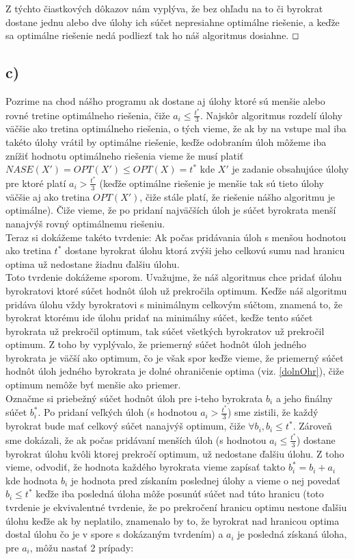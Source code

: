 \documentclass[a4paper]{article}
\begin{document}
Z týchto čiastkových dôkazov nám vyplýva, že bez ohľadu na to či byrokrat dostane jednu alebo dve úlohy ich súčet nepresiahne optimálne riešenie, a keďže sa optimálne riešenie nedá podliezť tak ho náš algoritmus dosiahne. $\oblong$

\subsection*{c)}

Pozrime na chod nášho programu ak dostane aj úlohy ktoré sú menšie alebo rovné tretine optimálneho riešenia, čiže $a_i \leq \frac{t^*}{3}$. Najskôr algoritmus rozdelí úlohy väčšie ako tretina optimálneho riešenia, o tých vieme, že ak by na vstupe mal iba takéto úlohy vrátil by optimálne riešenie, keďže odobraním úloh môžeme iba znížiť hodnotu optimálneho riešenia vieme že musí platiť $NASE(X') = OPT(X') \leq OPT(X) = t^*$ kde $X'$ je zadanie obsahujúce úlohy pre ktoré platí $a_i > \frac{t^*}{3}$ (keďže optimálne riešenie je menšie tak sú tieto úlohy väčšie aj ako tretina $OPT(X')$, čiže stále platí, že riešenie nášho algoritmu je optimálne). Čiže vieme, že po pridaní najväčších úloh je súčet byrokrata menší nanajvýš rovný optimálnemu riešeniu.
\\

Teraz si dokážeme takéto tvrdenie: Ak počas pridávania úloh s menšou hodnotou ako tretina $t^*$ dostane byrokrat úlohu ktorá zvýši jeho celkovú sumu nad hranicu optima už nedostane žiadnu ďalšiu úlohu.
\\

Toto tvrdenie dokážeme sporom. Uvažujme, že náš algoritmus chce pridať úlohu byrokratovi ktoré súčet hodnôt úloh už prekročila optimum. Keďže náš algoritmu pridáva úlohu vždy byrokratovi s minimálnym celkovým súčtom, znamená to, že byrokrat ktorému ide úlohu pridať na minimálny súčet, keďže tento súčet byrokrata už prekročil optimum, tak súčet všetkých byrokratov už prekročil optimum. Z toho by vyplývalo, že priemerný súčet hodnôt úloh jedného byrokrata je väčší ako optimum, čo je však spor keďže vieme, že priemerný súčet hodnôt úloh jedného byrokrata je dolné ohraničenie optima (viz. \ref{dolnOhr}), čiže optimum nemôže byť menšie ako priemer.
\\

Označme si priebežný súčet hodnôt úloh pre i-teho byrokrata $b_i$ a jeho finálny súčet $b^*_i$. Po pridaní veľkých úloh (s hodnotou $a_i > \frac{t^*}{3}$) sme zistili, že každý byrokrat bude mať celkový súčet nanajvýš optimum, čiže $\forall b_i, b_i \leq t^*$. Zároveň sme dokázali, že ak počas pridávaní menších úloh (s hodnotou $a_i \leq \frac{t^*}{3}$) dostane byrokrat úlohu kvôli ktorej prekročí optimum, už nedostane ďalšiu úlohu. Z toho vieme, odvodiť, že hodnota každého byrokrata vieme zapísať takto $b^*_i = b_i + a_i$ kde hodnota $b_i$ je hodnota pred získaním poslednej úlohy a vieme o nej povedať $b_i \leq t^*$ keďže iba posledná úloha môže posunúť súčet nad túto hranicu (toto tvrdenie je ekvivalentné tvrdenie, že po prekročení hranicu optimu nestone ďalšiu úlohu keďže ak by neplatilo, znamenalo by to, že byrokrat nad hranicou optima dostal úlohu čo je v spore s dokázaným tvrdením) a $a_i$ je posledná získaná úloha, pre $a_i$, môžu nastať 2 prípady:
\end{document}
